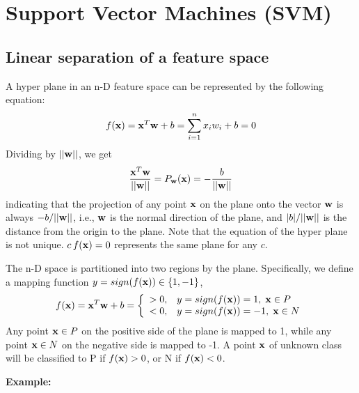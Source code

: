 \usepackage{html}


\section*{Support Vector Machines (SVM)}

\subsection*{Linear separation of a feature space}

A hyper plane in an n-D feature space can be represented by the following
equation:
\[ 
f({\bf x})={\bf x}^T {\bf w}+b=\sum_{i=1}^n x_i w_i+b=0	
\]
Dividing by $||{\bf w}||$, we get 
\[
\frac{{\bf x}^T {\bf w}}{||{\bf w}||}=P_{\bf w}({\bf x})
=-\frac{b}{||{\bf w}||}
\]
indicating that the projection of any point ${\bf x}$ on the plane onto 
the vector ${\bf w}$ is always $-b/||{\bf w}||$, i.e., ${\bf w}$ is the
normal direction of the plane, and $|b|/||{\bf w}|| $ is the distance 
from the origin to the plane. Note that the equation of the hyper plane
is not unique. $c\,f({\bf x})=0$ represents the same plane for any $c$.

The n-D space is partitioned into two regions by the plane. Specifically,
we define a mapping function $y=sign(f({\bf x})) \in \{1,-1\}$, 
\[ 
f({\bf x})={\bf x}^T {\bf w}+b=\left\{ \begin{array}{ll} >0, & 
  y=sign(f({\bf x}))=1,\;{\bf x}\in P  \\
  <0, &  y=sign(f({\bf x}))=-1,\;{\bf x}\in N \\
\end{array} \right. 
\]
Any point ${\bf x}\in P$ on the positive side of the plane is mapped to 1,
while any point ${\bf x}\in N$ on the negative side is mapped to -1. A point 
${\bf x}$ of unknown class will be classified to P if $f({\bf x})>0$, or N if 
$f({\bf x})<0$.


{\bf Example:}


